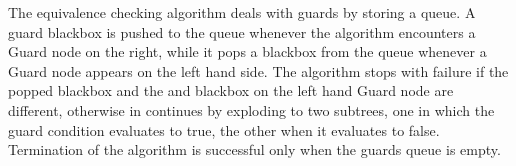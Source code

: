 \documentclass[12pt]{article}
\begin{document}
The equivalence checking algorithm deals with guards by storing a
queue. A guard blackbox is pushed to the queue whenever the algorithm
encounters a Guard node on the right, while it pops a blackbox from
the queue whenever a Guard node appears on the left hand side.
The algorithm stops with failure if the popped blackbox and the and
blackbox on the left hand Guard node are different, otherwise in
continues by exploding to two subtrees, one in which the guard
condition evaluates to true, the other when it evaluates to false.
Termination of the algorithm is successful only when the guards queue
is empty.

\begin{comment}

  ------------------------
  equiv \emptyset Cs Ct gs

  --------------------------
  equiv S Failure Failure []

  equiv_BB BBs BBt
  -------------------------------
  equiv S (Leaf BBs) (Leaf BBt) []

  Cs \in (Leaf BBs, Failure)
  (equiv S Cs Ci gs)^i
  equiv S Cs Cf gs
  -----------------------------------------
  equiv S Cs (Node(a, (Domi,Ci)^i, Cf)) gs

  equiv S Ci (trim Ct a=Ki) gs
  equiv S Cf (trim Ct (a\notin(K_i)^i) gs
  -------------------------------------
  equiv S (Node(a, (Ki,Ci)^i, Cf) Ct gs

  equiv S Ctrue Ct (gs++[condition])
  equiv S Cfalse Ct (gs++[condition])
  --------------------------------------------
  equiv S (Guard condition Ctrue Cfalse) Ct gs

  equiv S Cs Ctrue gs
  equiv S Cs Cfalse gs
  --------------------------------------------
  equiv S Cs (Guard condition Ctrue Cfalse) ([condition]++gs)
  
\end{comment}

\end{document}
